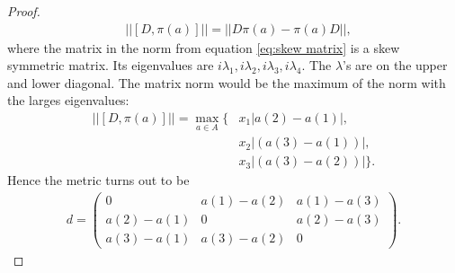 \begin{proof}
    \begin{align}\label{eq:skew matrix}
        &\big|\big|[D, \pi(a)]\big|\big| = \big|\big|D\pi(a) - \pi(a)D\big|\big|,
    \end{align}
    where the matrix in the norm from equation \eqref{eq:skew matrix} is a
    skew symmetric matrix. Its eigenvalues are $i\lambda_1, i\lambda_2,
    i\lambda_3, i\lambda_4$. The $\lambda$'s are on the upper and lower
    diagonal. The matrix norm would be the maximum of the norm with the
    larges eigenvalues:
    \begin{align}
        \big|\big|[D, \pi(a)]\big|\big| = \max_{a\in A}\bigg\{&x_1\big|a(2)-a(1)\big|,\nonumber\\ &x_2\big|(a(3)-a(1))\big|,\nonumber\\
        &x_3\big|(a(3)-a(2))\big|\bigg\}.
    \end{align}
    Hence the metric turns out to be
    \begin{align}
        d =
        \begin{pmatrix}
            0 & a(1)-a(2) & a(1)-a(3)\\
            a(2)-a(1) & 0 & a(2)-a(3)\\
            a(3)-a(1) & a(3)-a(2) & 0
        \end{pmatrix}.
    \end{align}


\end{proof}
